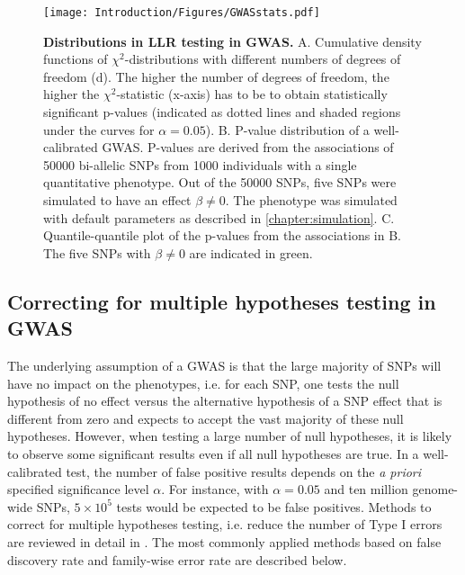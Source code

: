 \begin{figure}[hbtp]
	\centering
	\texttt{[image: Introduction/Figures/GWASstats.pdf]}
	\caption[\textbf{Log-likelihood ratio testing in GWAS.}]{\textbf{Distributions in LLR testing in GWAS. }A. Cumulative density functions of \(\chi^2\)-distributions with different numbers of degrees of freedom (d). The higher the number of degrees of freedom, the higher the \(\chi^2\)-statistic (x-axis) has to be to obtain statistically significant p-values (indicated as dotted lines and shaded regions under the curves for \(\alpha=0.05\)). B. P-value distribution of a well-calibrated GWAS. P-values are derived from the associations of \num{50000} bi-allelic SNPs from \num{1000} individuals with a single quantitative phenotype. Out of the \num{50000} SNPs, five SNPs were simulated to have an effect \(\beta \neq 0\). The phenotype was simulated with default parameters as described in \cref{chapter:simulation}.  C. Quantile-quantile plot of the p-values from the associations in B. The five SNPs with \(\beta \neq 0\) are indicated in green.}
	 	\label{fig:GWAS-stats}
\end{figure}

\subsection{Correcting for multiple hypotheses testing in GWAS}
\label{subsection:multiple-testing}
The underlying assumption of a GWAS is that the large majority of SNPs will have no impact on the phenotypes, i.e. for each SNP, one tests the null hypothesis of no effect versus the alternative hypothesis of a SNP effect that is different from zero and expects to accept the vast majority of these null hypotheses. However, when testing a large number of null hypotheses, it is likely to observe some significant results even if all null hypotheses are true. In a well-calibrated test, the number of false positive results depends on the \textit{a priori} specified significance level \(\alpha\). For instance, with  \(\alpha=0.05\) and ten million genome-wide SNPs, \(5 \times 10^5\) tests would be expected to be false positives. Methods to correct for multiple hypotheses testing, i.e. reduce the number of Type I errors are reviewed in detail in \citep{Shaffer1995}. The most commonly applied methods based on false discovery rate and family-wise error rate are described below.

